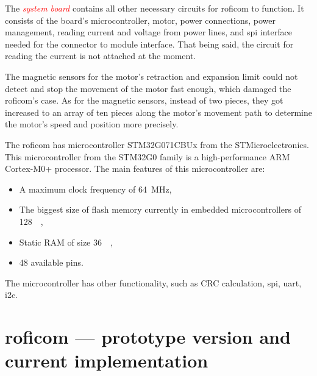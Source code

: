 \documentclass[
  digital,     %
  oneside,     %
  nosansbold,  %
  nocolorbold, %
  nolof,         %
  nolot,         %
]{fithesis4}
\newcommand{\TODO}[1]{\textcolor{red}{\textit{#1}}}
\newcommand{\TODOLIST}[1]{}
\begin{document}
{{{The \TODO{system board} contains all other necessary circuits for \acrshort{roficom} to function. It consists of the board's microcontroller, motor, power connections, power management, reading current and voltage from power lines, and \acrshort{spi} interface needed for the connector to module interface. That being said, the circuit for reading the current is not attached at the moment.


The magnetic sensors for the motor's retraction and expansion limit could not detect and stop the movement of the motor fast enough, which damaged the \acrshort{roficom}'s case.
As for the magnetic sensors, instead of two pieces, they got increased to an array of ten pieces along the motor's movement path to determine the motor's speed and position more precisely.

The \acrshort{roficom} has microcontroller STM32G071CBUx from the STMicroelectronics. This microcontroller from the STM32G0 family is a high-performance ARM Cortex-M0+ processor. The main features of this microcontroller are:

\begin{itemize}
    \item A maximum clock frequency of \qty{64}{\mega\hertz},
    \item The biggest size of flash memory currently in embedded microcontrollers of \qty{128}{\kilo\byte},
    \item Static RAM of size \qty{36}{\kilo\byte},
    \item 48 available pins.
\end{itemize}

The microcontroller has other functionality, such as CRC calculation, \acrshort{spi}, \acrshort{uart}, \acrshort{i2c}.


\chapter[ RoFICoM --- prototype version and current implementation ]{ \acrshort{roficom} --- prototype version and current implementation }
\TODOLIST{
\begin{itemize}
    \item Project structure/architecture
    \begin{itemize}
        \item suites
        \item Protocol
    \end{itemize}
    \item \texttt{control\_board}
    \item \texttt{stm32cxx}
    \item \texttt{rofi-hal}
\end{itemize}
}

}}}
\end{document}
